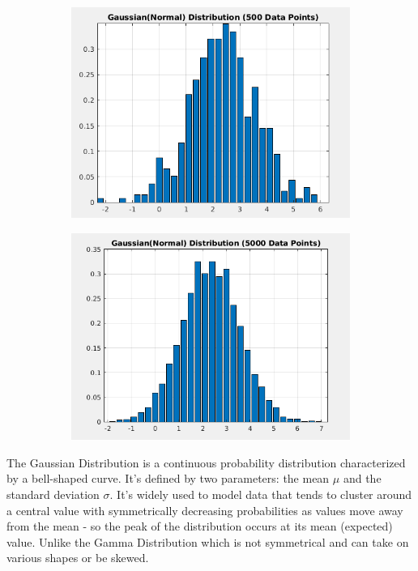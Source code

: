 \documentclass{article}
\theoremstyle{mytheoremstyle}
\theoremstyle{mytheoremstyle}
\theoremstyle{myproblemstyle}
\begin{document}
\begin{figure}[htbp]
    \begin{subfigure}[b]{0.5\textwidth}
        \includegraphics[width=\linewidth]{gauss_5.png}
    \end{subfigure}
    \begin{subfigure}[b]{0.5\textwidth}
        \includegraphics[width=\linewidth]{gauss_5k.png}    
    \end{subfigure}
\end{figure}

The Gaussian Distribution is a continuous probability distribution characterized by a bell-shaped curve. It's defined by two parameters: the mean $\mu$ and the standard deviation $\sigma$. It's widely used to model data that tends to cluster around a central value with symmetrically decreasing probabilities as values move away from the mean - so the peak of the distribution occurs at its mean (expected) value. Unlike the Gamma Distribution which is not symmetrical and can take on various shapes or be skewed. 
\end{document}
